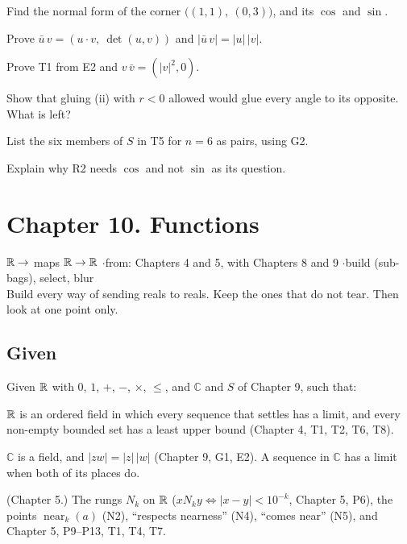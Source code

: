 \begin{lines}
\item[\lab{E1}] Find the normal form of the corner $\bigl((1,1),\ (0,3)\bigr)$, and its $\cos$ and $\sin$.
\item[\lab{E2}] Prove $\bar u\, v = (u \cdot v,\ \det(u,v))$ and $|\bar u\, v| = |u|\,|v|$.
\item[\lab{E3}] Prove T1 from E2 and $v\, \bar v = (|v|^2, 0)$.
\item[\lab{E4}] Show that gluing (ii) with $r < 0$ allowed would glue every angle to its opposite. What is left?
\item[\lab{E5}] List the six members of $S$ in T5 for $n = 6$ as pairs, using G2.
\item[\lab{E6}] Explain why R2 needs $\cos$ and not $\sin$ as its question.
\end{lines}

\newpage

\section*{Chapter 10. Functions}
\begin{center}
{\normalsize $\mathbb{R} \to$ maps $\mathbb{R} \to \mathbb{R}$ \quad$\cdot$\quad from: Chapters 4 and 5, with Chapters 8 and 9 \quad$\cdot$\quad build (sub-bags), select, blur}\\[4pt]
{\small Build every way of sending reals to reals. Keep the ones that do not tear. Then look at one point only.}
\end{center}

\subsection*{Given}

Given $\mathbb{R}$ with $0$, $1$, $+$, $-$, $\times$, $\le$, and $\mathbb{C}$ and $S$ of Chapter 9, such that:
\begin{lines}
\item[\lab{G1}] $\mathbb{R}$ is an ordered field in which every sequence that settles has a limit, and every non-empty bounded set has a least upper bound (Chapter 4, T1, T2, T6, T8).
\item[\lab{G2}] $\mathbb{C}$ is a field, and $|zw| = |z|\,|w|$ (Chapter 9, G1, E2). A sequence in $\mathbb{C}$ has a limit when both of its places do.
\item[\lab{G3}] (Chapter 5.) The rungs $N_k$ on $\mathbb{R}$ ($x \mathrel{N_k} y \iff |x - y| < 10^{-k}$, Chapter 5, P6), the points $\operatorname{near}_k(a)$ (N2), ``respects nearness'' (N4), ``comes near'' (N5), and Chapter 5, P9--P13, T1, T4, T7.
\end{lines}


